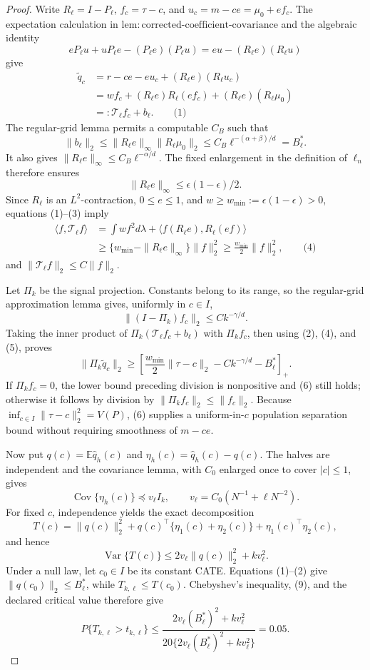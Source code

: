 \documentclass{article}
\begin{document}
\begin{proof}
Write \(R_\ell=I-P_\ell\), \(f_c=\tau-c\), and \(u_c=m-ce=\mu_0+ef_c\).  The expectation calculation in \(\mathrm{lem:corrected\mbox{-}coefficient\mbox{-}covariance}\) and the algebraic identity
\[
 eP_\ell u+uP_\ell e-(P_\ell e)(P_\ell u)
 =eu-(R_\ell e)(R_\ell u)
\]
give
\[
\begin{aligned}
 \widetilde q_c
 &=r-ce-eu_c+(R_\ell e)(R_\ell u_c)\\
 &=w f_c+(R_\ell e)R_\ell(ef_c)+(R_\ell e)(R_\ell\mu_0)\\
 &=:\mathcal T_\ell f_c+b_\ell. \qquad\text{(1)}
\end{aligned}
\]
The regular-grid lemma permits a computable \(C_B\) such that
\[
 \|b_\ell\|_2
 \le\|R_\ell e\|_\infty\|R_\ell\mu_0\|_2
 \le C_B\ell^{-(\alpha+\beta)/d}=B_\ell^*. \tag{2}
\]
It also gives \(\|R_\ell e\|_\infty\le C_B\ell^{-\alpha/d}\).  The fixed enlargement in the definition of \(\ell_n\) therefore ensures
\[
 \|R_\ell e\|_\infty\le\epsilon(1-\epsilon)/2. \tag{3}
\]
Since \(R_\ell\) is an \(L^2\)-contraction, \(0\le e\le1\), and \(w\ge w_{\min}:=\epsilon(1-\epsilon)>0\), equations (1)--(3) imply
\[
\begin{aligned}
 \langle f,\mathcal T_\ell f\rangle
 &=\int wf^2d\lambda+\langle f(R_\ell e),R_\ell(ef)\rangle\\
 &\ge\{w_{\min}-\|R_\ell e\|_\infty\}\|f\|_2^2
 \ge\frac{w_{\min}}2\|f\|_2^2, \qquad\text{(4)}
\end{aligned}
\]
and \(\|\mathcal T_\ell f\|_2\le C\|f\|_2\).

Let \(\Pi_k\) be the signal projection.  Constants belong to its range, so the regular-grid approximation lemma gives, uniformly in \(c\in I\),
\[
 \|(I-\Pi_k)f_c\|_2\le Ck^{-\gamma/d}. \tag{5}
\]
Taking the inner product of \(\Pi_k(\mathcal T_\ell f_c+b_\ell)\) with \(\Pi_kf_c\), then using (2), (4), and (5), proves
\[
 \|\Pi_k\widetilde q_c\|_2
 \ge\left[\frac{w_{\min}}2\|\tau-c\|_2
              -Ck^{-\gamma/d}-B_\ell^*\right]_+. \tag{6}
\]
If \(\Pi_kf_c=0\), the lower bound preceding division is nonpositive and (6) still holds; otherwise it follows by division by \(\|\Pi_kf_c\|_2\le\|f_c\|_2\).  Because \(\inf_{c\in I}\|\tau-c\|_2^2=V(P)\), (6) supplies a uniform-in-\(c\) population separation bound without requiring smoothness of \(m-ce\).

Now put \(q(c)=\mathbb E\widehat q_h(c)\) and \(\eta_h(c)=\widehat q_h(c)-q(c)\).  The halves are independent and the covariance lemma, with \(C_0\) enlarged once to cover \(|c|\le1\), gives
\[
 \operatorname{Cov}\{\eta_h(c)\}\preceq v_\ell I_k,
 \qquad v_\ell=C_0(N^{-1}+\ell N^{-2}). \tag{7}
\]
For fixed \(c\), independence yields the exact decomposition
\[
 T(c)=\|q(c)\|_2^2+q(c)^\top\{\eta_1(c)+\eta_2(c)\}
             +\eta_1(c)^\top\eta_2(c), \tag{8}
\]
and hence
\[
 \operatorname{Var}\{T(c)\}
 \le2v_\ell\|q(c)\|_2^2+kv_\ell^2. \tag{9}
\]
Under a null law, let \(c_0\in I\) be its constant CATE.  Equations (1)--(2) give \(\|q(c_0)\|_2\le B_\ell^*\), while \(T_{k,\ell}\le T(c_0)\).  Chebyshev's inequality, (9), and the declared critical value therefore give
\[
 P\{T_{k,\ell}>t_{k,\ell}\}
 \le\frac{2v_\ell(B_\ell^*)^2+kv_\ell^2}
 {20\{2v_\ell(B_\ell^*)^2+kv_\ell^2\}}
 =0.05. \tag{10}
\]


\end{proof}
\end{document}
